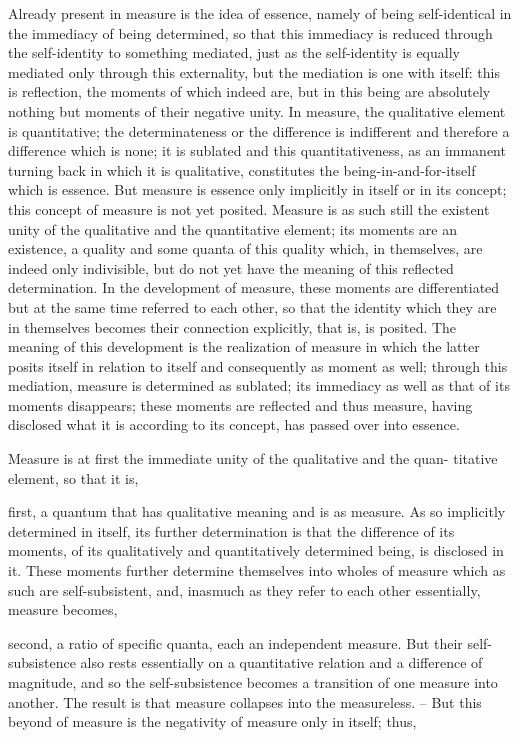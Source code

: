 Already present in measure is the idea of essence,
namely of being self-identical in the immediacy of being determined,
so that this immediacy is reduced through the self-identity to
something mediated, just as the self-identity is equally mediated
only through this externality, but the mediation is one with itself:
this is reflection, the moments of which indeed are, but
in this being are absolutely nothing but moments of their negative unity.
In measure, the qualitative element is quantitative;
the determinateness or the difference is indifferent and
therefore a difference which is none;
it is sublated and this quantitativeness,
as an immanent turning back in which it is qualitative,
constitutes the being-in-and-for-itself which is essence.
But measure is essence only implicitly in itself or in its concept;
this concept of measure is not yet posited.
Measure is as such still the existent unity of the
qualitative and the quantitative element;
its moments are an existence, a quality and some quanta of this quality
which, in themselves, are indeed only indivisible,
but do not yet have the meaning of this reflected determination.
In the development of measure, these moments are differentiated
but at the same time referred to each other,
so that the identity which they are in themselves becomes
their connection explicitly, that is, is posited.
The meaning of this development is the realization of measure in which the
latter posits itself in relation to itself and consequently as moment as well;
through this mediation, measure is determined as sublated; its immediacy
as well as that of its moments disappears; these moments are reflected and
thus measure, having disclosed what it is according to its concept, has
passed over into essence.

Measure is at first the immediate unity of the qualitative and the quan-
titative element, so that it is,

first, a quantum that has qualitative meaning and is as measure. As
so implicitly determined in itself, its further determination is that the
difference of its moments, of its qualitatively and quantitatively determined
being, is disclosed in it. These moments further determine themselves into
wholes of measure which as such are self-subsistent, and, inasmuch as they
refer to each other essentially, measure becomes,

second, a ratio of specific quanta, each an independent measure. But
their self-subsistence also rests essentially on a quantitative relation and a
difference of magnitude, and so the self-subsistence becomes a transition
of one measure into another. The result is that measure collapses into the
measureless. – But this beyond of measure is the negativity of measure only
in itself; thus,

